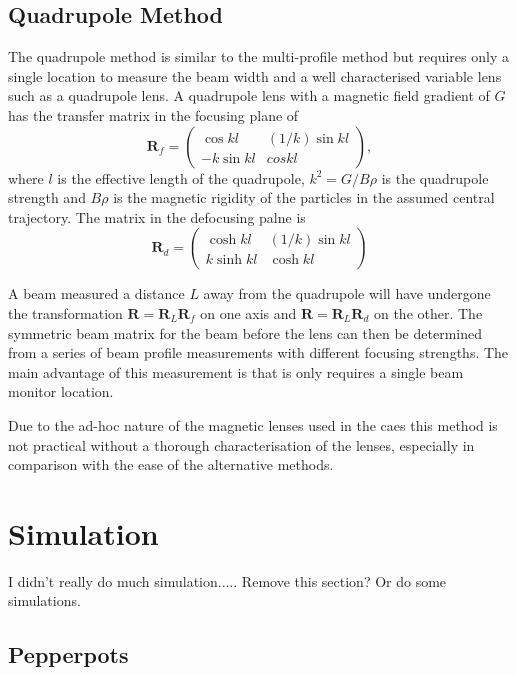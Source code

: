 \subsection{Quadrupole Method}

The quadrupole method is similar to the multi-profile method but requires only a single location to measure the beam width and a well characterised variable lens such as a quadrupole lens.
A quadrupole lens with a magnetic field gradient of $G$ has the transfer matrix in the focusing plane of
\begin{equation}
\mathbf{R}_f = \begin{pmatrix} \cos kl & (1/k)\sin kl\\
-k\sin kl & cos kl\end{pmatrix},
\end{equation}
where $l$ is the effective length of the quadrupole, $k^2=G/B\rho$ is the quadrupole strength and $B\rho$ is the magnetic rigidity of the particles in the assumed central trajectory.
The matrix in the defocusing palne is
\begin{equation}
\mathbf{R}_d = \begin{pmatrix} \cosh kl & (1/k) \sin kl\\
k \sinh kl & \cosh kl \end{pmatrix}
\end{equation}

A beam measured a distance $L$ away from the quadrupole will have undergone the transformation $\mathbf{R}=\mathbf{R}_L\mathbf{R}_f$ on one axis and $\mathbf{R}=\mathbf{R}_L\mathbf{R}_d$ on the other.
The symmetric beam matrix for the beam before the lens can then be determined from a series of beam profile measurements with different focusing strengths.
The main advantage of this measurement is that is only requires a single beam monitor location.

Due to the ad-hoc nature of the magnetic lenses used in the \gls{caes} this method is not practical without a thorough characterisation of the lenses, especially in comparison with the ease of the alternative methods.

\section{Simulation}

I didn't really do much simulation..... Remove this section? Or do some simulations.


\subsection{Pepperpots}

